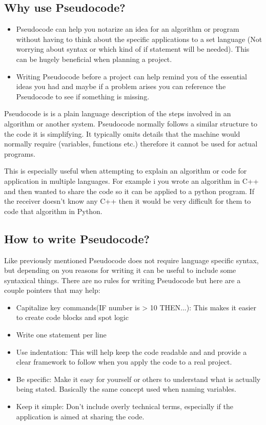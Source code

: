 \documentclass[a4paper]{article}
\begin{document}
\subsection{Why use Pseudocode?}
\begin{itemize}
    \item Pseudocode can help you notarize an idea for an algorithm or program without having to think about the specific applications to a set language (Not worrying about syntax or which kind of if statement will be needed). This can be hugely beneficial when planning a project. 
\item Writing Pseudocode before a project can help remind you of the essential ideas you had and maybe if a problem arises you can reference the Pseudocode to see if something is missing.
\end{itemize}
Pseudocode is is a plain language description of the steps involved in an algorithm or another system. Pseudocode normally follows a similar structure to the code it is simplifying. It typically omits details that the machine would normally require (variables, functions etc.) therefore it cannot be used for actual programs. 

This is especially useful when attempting to explain an algorithm or code for application in multiple languages. For example i you wrote an algorithm in C++ and then wanted to share the code so it can be applied to a python program. If the receiver doesn't know any C++ then it would be very difficult for them to code that algorithm in Python.

\subsection{How to write Pseudocode?}
Like previously mentioned Pseudocode does not require language specific syntax, but depending on you reasons for writing it can be useful to include some syntaxical things. There are no rules for writing Pseudocode but here are a couple pointers that may help:
\begin{itemize}
\item Capitalize key commands(IF number is > 10 THEN...): This makes it easier to create code blocks and spot logic
\item Write one statement per line
\item Use indentation: This will help keep the code readable and and provide a clear framework to follow when you apply the code to a real project.
\item Be specific: Make it easy for yourself or others to understand what is actually being stated. Basically the same concept used when naming variables.
\item Keep it simple: Don't include overly technical terms, especially if the application is aimed at sharing the code. 
\end{itemize}
\end{document}
